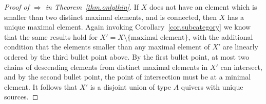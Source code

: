 \documentclass[10pt,a4paper]{amsart}
\begin{document}
\begin{proof}[Proof of \( \Rightarrow \) in Theorem~\ref{thm.onlythin}]
If \( X \) does not have an element which is smaller than two distinct maximal elements, and is connected, then \( X \) has a unique maximal element. Again invoking Corollary~\ref{cor.subcategory} we know that the same results hold for \( X' = X \setminus \{ \text{maximal element} \} \), with the additional condition that the elements smaller than any maximal element of \( X' \) are linearly ordered by the third bullet point above. By the first bullet point, at most two chains of descending elements from distinct maximal elements in $X'$ can intersect, and by the second bullet point, the point of intersection must be at a minimal element. It follows that \( X' \) is a disjoint union of type \( A \) quivers with unique sources.
\end{proof}
\end{document}
